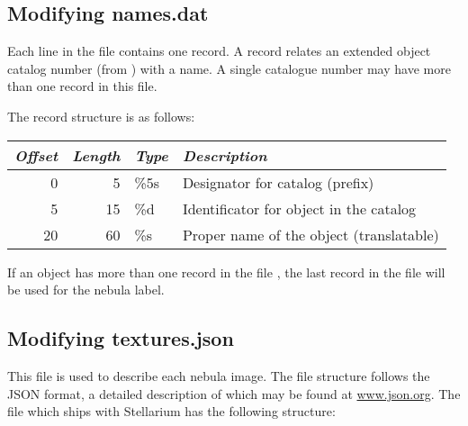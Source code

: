 \subsection{Modifying names.dat}%
\label{sec:dso:modifyingNamesDat}

Each line in the file   contains one record. A record
relates an extended object catalog number (from )
with a name. A single catalogue number may have more than one record in
this file.

The record structure is as follows:

\noindent%
\begin{tabularx}{\textwidth}{r|r|l|X}
\toprule
\emph{Offset} & \emph{Length} & \emph{Type} & \emph{Description}\\
\midrule
0  &  5 & \%5s & Designator for catalog (prefix)\\
5  & 15 & \%d  & Identificator for object in the catalog\\
20 & 60 & \%s  & Proper name of the object (translatable)\\
\bottomrule
\end{tabularx}

\noindent If an object has more than one record in the file ,
the last record in the file will be used for the nebula label.

\subsection{Modifying textures.json}%
\label{sec:dso:modifyingTexturesJson}

This file is used to describe each nebula image. The file structure
follows the JSON format, a detailed description of which may be found
at \url{www.json.org}. The  file which ships with
Stellarium has the following structure:



